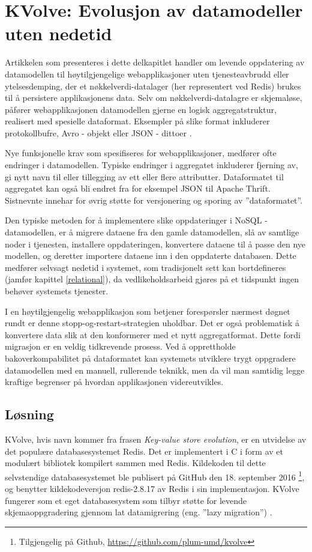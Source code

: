 \section{KVolve: Evolusjon av datamodeller uten nedetid}

Artikkelen som presenteres i dette delkapitlet handler om levende oppdatering av datamodellen til høytilgjengelige webapplikasjoner uten tjenesteavbrudd eller ytelsesdemping, der et nøkkelverdi-datalager (her representert ved Redis) brukes til å persistere applikasjonens data. Selv om nøkkelverdi-datalagre er skjemaløse, påfører webapplikasjonen datamodellen gjerne en logisk aggregatstruktur, realisert med spesielle dataformat. Eksempler på slike format inkluderer protokollbufre, Avro - objekt eller JSON - dittoer \citep{saur2016}.

Nye funksjonelle krav som spesifiseres for webapplikasjoner, medfører ofte endringer i datamodellen. Typiske endringer i aggregatet inkluderer fjerning av, gi nytt navn til eller tillegging av ett eller flere attributter. Dataformatet til aggregatet kan også bli endret fra for eksempel JSON til Apache Thrift. Sistnevnte innehar for øvrig støtte for versjonering og sporing av ''dataformatet''.

Den typiske metoden for å implementere slike oppdateringer i NoSQL - datamodellen, er å migrere dataene fra den gamle datamodellen, slå av samtlige noder i tjenesten, installere oppdateringen, konvertere dataene til å passe den nye modellen, og deretter importere dataene inn i den oppdaterte databasen. Dette medfører selvsagt nedetid i systemet, som tradisjonelt sett kan bortdefineres (jamfør kapittel \ref{relational}), da vedlikeholdsarbeid gjøres på et tidspunkt ingen behøver systemets tjenester.

I en høytilgjengelig webapplikasjon som betjener forespørsler nærmest døgnet rundt er denne stopp-og-restart-strategien uholdbar. Det er også problematisk å konvertere data slik at den konformerer med et nytt aggregatformat. Dette fordi migrasjon er en veldig tidkrevende prosess. Ved å opprettholde bakoverkompabilitet på dataformatet kan systemets utviklere trygt oppgradere datamodellen med en manuell, rullerende teknikk, men da vil man samtidig legge kraftige begrenser på hvordan applikasjonen videreutvikles.

\subsection{Løsning}
KVolve, hvis navn kommer fra frasen \emph{Key-value store evolution}, er en utvidelse av det populære databasesystemet Redis. Det er implementert i C i form av et modulært bibliotek kompilert sammen med Redis. Kildekoden til dette selvstendige databasesystemet ble publisert på GitHub den 18. september 2016 \footnote{Tilgjengelig på Github, \url{https://github.com/plum-umd/kvolve}}, og benytter kildekodeversjon redis-2.8.17 av Redis i sin implementasjon. KVolve fungerer som et eget databasesystem som tilbyr støtte for levende skjemaoppgradering gjennom lat datamigrering (eng. ''lazy migration'') \citep{saur2016}.

